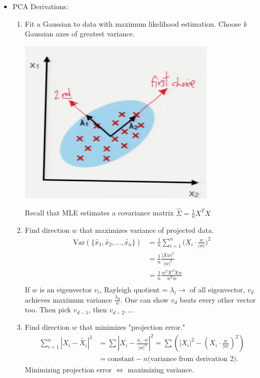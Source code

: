 \documentclass[10pt]{article}
\begin{document}
\begin{itemize}
\begin{itemize}
			\end{itemize}
		\item PCA Derivations:
			\begin{enumerate}
				\item Fit a Gaussian to data with maximum likelihood estimation. Choose $k$ Gaussian axes of greatest variance. 
				\begin{center}
					\includegraphics[scale=0.5]{../images/2dpca}
				\end{center}
				Recall that MLE estimates a covariance matrix $\hat{\Sigma} = \frac{1}{n} X^{T}X$
				
				\item Find direction $w$ that maximizes variance of projected data.
					\begin{align*}
						\text{Var}(\{\tilde{x_{1}}, \tilde{x_{2}}, \dots, \tilde{x_{n}}\}) &= \frac{1}{n} \sum_{i=1}^{n} \Big(X_{i} \cdot \frac{w}{|w|}\Big)^{2}\\
						&= \frac{1}{n} \frac{|Xw|^{2}}{|w|^{2}}\\
						&= \frac{1}{n} \frac{w^{T}X^{T}Xw}{w^{T}w}\\
					\end{align*}
					If $w$ is an eigenvector $v_{i}$, Rayleigh quotient = $\lambda_{i} \rightarrow$ of all eigenvector, $v_{d}$ achieves maximum variance $\frac{\lambda_{d}}{n}$. One can show $v_{d}$ beats every other vector too.
					Then pick $v_{d-1}$, then $v_{d-2}, \dots$
				
				\item Find direction $w$ that minimizes "projection error."
					\begin{align*}
						\sum_{i=1}^{n} |X_{i} - \tilde{X_{i}}|^{2} &= \sum |X_{i} - \frac{x_{i} \cdot w}{|w|^{2}}|^{2} = \sum (|X_{i}|^{2} - (X_{i} \cdot \frac{w}{|w|})^{2})\\
						&= \text{constant} - n\text{(variance from derivation 2)}.
					\end{align*}
					Minimizing projection error $\Leftrightarrow$ maximizing variance.
			\end{enumerate}
	\end{itemize}
\end{document}
